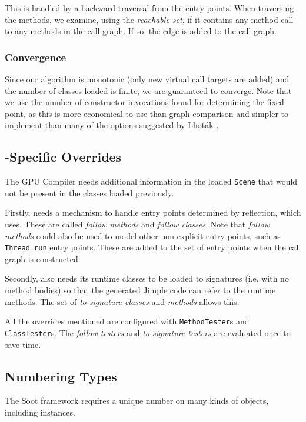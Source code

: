 \documentclass{sigplanconf}
\begin{document}
This is handled by a backward traversal from the entry points. When traversing the methods, we examine, using the \emph{reachable set}, if it contains any method call to any methods in the call graph. If so, the edge is added to the call graph.

\subsubsection{Convergence}
Since our algorithm is monotonic (only new virtual call targets are added) and the number of classes loaded is finite, we are guaranteed to converge. Note that we use the number of constructor invocations found for determining the fixed point, as this is more economical to use than graph comparison and simpler to implement than many of the options suggested by Lhoták \cite{lhot02}.

\subsection{\rb{}-Specific Overrides}
\label{sec:followtosig}

The \rb GPU Compiler needs additional information in the loaded {\tt Scene} that would not be present in the classes loaded previously.

Firstly, \rb needs a mechanism to handle entry points determined by reflection, which \rb uses. These are called \emph{follow methods} and \emph{follow classes}. Note that \emph{follow methods} could also be used to model other non-explicit entry points, such as {\tt Thread.run} entry points. These are added to the set of entry points when the call graph is constructed.

Secondly, \rb also needs its runtime classes to be loaded to signatures (i.e. with no method bodies) so that the generated Jimple code can refer to the runtime methods. The set of \emph{to-signature classes} and \emph{methods} allows this.

All the overrides mentioned are configured with {\tt MethodTester}s and {\tt ClassTester}s. The \emph{follow testers} and \emph{to-signature testers} are evaluated once to save time.

\subsection{Numbering Types}
\label{sec:numbering}
The Soot framework requires a unique number on many kinds of objects, including \sootclass instances.
\end{document}
